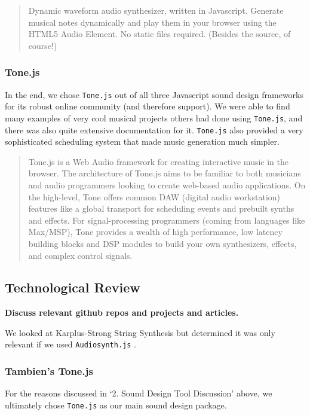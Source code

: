 \documentclass[12pt,a4paper]{article}
\newcommand{\lightcode}[1]{\colorbox{light-gray}{\texttt{#1}}}
\begin{document}
\begin{quote}
Dynamic waveform audio synthesizer, written in Javascript. Generate musical notes dynamically and play them in your browser using the HTML5 Audio Element. No static files required. (Besides the source, of course!) \cite{audiosynth}
\end{quote}


\subsubsection{Tone.js}
In the end, we chose \lightcode{Tone.js} out of all three Javascript sound design frameworks for its robust online community (and therefore support). We were able to find many examples of very cool musical projects others had done using \lightcode{Tone.js}, and there was also quite extensive documentation for it. \lightcode{Tone.js} also provided a very sophisticated scheduling system that made music generation much simpler.

\begin{quote}
Tone.js is a Web Audio framework for creating interactive music in the browser. The architecture of Tone.js aims to be familiar to both musicians and audio programmers looking to create web-based audio applications. On the high-level, Tone offers common DAW (digital audio workstation) features like a global transport for scheduling events and prebuilt synths and effects. For signal-processing programmers (coming from languages like Max/MSP), Tone provides a wealth of high performance, low latency building blocks and DSP modules to build your own synthesizers, effects, and complex control signals. \cite{tonejs}
\end{quote}

\subsection{Technological Review}
\textbf{Discuss relevant github repos and projects and articles.}

We looked at Karplus-Strong String Synthesis but determined it was only relevant if we used \lightcode{Audiosynth.js} \cite{karplus-strong}.

\subsubsection{Tambien's Tone.js}
For the reasons discussed in `2. Sound Design Tool Discussion' above, we ultimately chose \lightcode{Tone.js} as our main sound design package.
\end{document}
